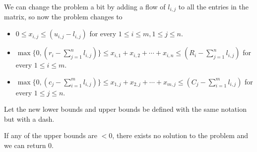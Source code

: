 \documentclass{article}
\begin{document}
We can change the problem a bit by adding a flow of $l_{i, j}$ to all the entries in the matrix, so now the problem changes to 

\begin{itemize}
    \item $0 \le x_{i,j} \le (u_{i,j} - l_{i, j})$ for every $1 \le i \le m, 1 \le j \le n$.
    \item $\max\{0, (r_i - \sum_{j=1}^n l_{i, j})\} \le x_{i,1} + x_{i,2} + \cdots + x_{i,n} \le (R_i - \sum_{j=1}^n l_{i, j})$ for every $1 \le i \le m$.
    \item $\max\{0, (c_j - \sum_{i=1}^m l_{i, j})\} \le x_{1,j} + x_{2,j} + \cdots + x_{m,j} \le (C_j - \sum_{i=1}^m l_{i, j})$ for every $1 \le j \le n$.
\end{itemize}

Let the new lower bounds and upper bounds be defined with the same notation but with a dash.

If any of the upper bounds are $< 0$, there exists no solution to the problem and we can return 0.
\end{document}
